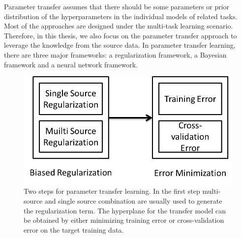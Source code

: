 Parameter transfer assumes that there should be some parameters or prior distribution of the hyperparameters in the individual models of related tasks. Most of the approaches are designed under the multi-task learning scenario. Therefore, in this thesis, we also focus on the parameter transfer approach to leverage the knowledge from the source data. In parameter transfer learning, there are three major frameworks: a regularization framework, a Bayesian framework and a neural network framework.
\begin{figure}
	\centering
	\includegraphics[scale =1]{relatedwork/fig/parameters.png}
	\caption{Two steps for parameter transfer learning. In the first step multi-source and single source combination are usually used to generate the regularization term. The hyperplane for the transfer model can be obtained by either minimizing training error or cross-validation error on the target training data.}
\end{figure}
